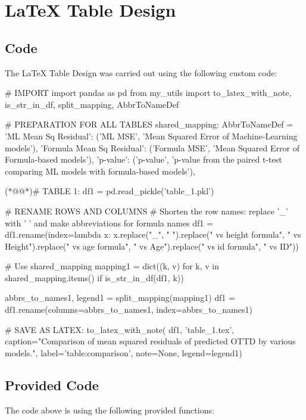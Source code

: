 \documentclass[11pt]{article}
\begin{document}
\section{LaTeX Table Design}
\subsection{{Code}}
The LaTeX Table Design was carried out using the following custom code:

\begin{python}

# IMPORT
import pandas as pd
from my_utils import to_latex_with_note, is_str_in_df, split_mapping, AbbrToNameDef

# PREPARATION FOR ALL TABLES
shared_mapping: AbbrToNameDef = {
    'ML Mean Sq Residual': ('ML MSE', 'Mean Squared Error of Machine-Learning models'),
    'Formula Mean Sq Residual': ('Formula MSE', 'Mean Squared Error of Formula-based models'),
    'p-value': ('p-value', 'p-value from the paired t-test comparing ML models with formula-based models'),
}

(*@@*)# TABLE 1:
df1 = pd.read_pickle('table_1.pkl')

# RENAME ROWS AND COLUMNS
# Shorten the row names: replace '_' with ' ' and make abbreviations for formula names
df1 = df1.rename(index=lambda x: x.replace("_", " ").replace(" vs height formula", " vs Height").replace(" vs age formula", " vs Age").replace(" vs id formula", " vs ID"))

# Use shared_mapping
mapping1 = dict((k, v) for k, v in shared_mapping.items() if is_str_in_df(df1, k))

abbrs_to_names1, legend1 = split_mapping(mapping1)
df1 = df1.rename(columns=abbrs_to_names1, index=abbrs_to_names1)

# SAVE AS LATEX:
to_latex_with_note(
    df1, 'table_1.tex',
    caption="Comparison of mean squared residuals of predicted OTTD by various models.", 
    label='table:comparison',
    note=None,
    legend=legend1)

\end{python}

\subsection{Provided Code}
The code above is using the following provided functions:
\end{document}
